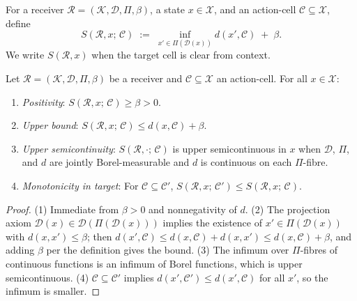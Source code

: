 \begin{definition}
\label{def:s-functional-canonical}
For a receiver $\mathcal{R} = (\mathcal{K}, \mathcal{D}, \Pi, \beta)$, a
state $x \in \mathcal{X}$, and an action-cell $\mathcal{C} \subseteq \mathcal{X}$,
define
\[
  S(\mathcal{R}, x;\, \mathcal{C})
  \;:=\; \inf_{x' \in \Pi(\mathcal{D}(x))} d(x', \mathcal{C}) \;+\; \beta .
\]
We write $S(\mathcal{R}, x)$ when the target cell is clear from context.
\end{definition}

\begin{proposition}
\label{prop:s-basic}
Let $\mathcal{R} = (\mathcal{K}, \mathcal{D}, \Pi, \beta)$ be a receiver and
$\mathcal{C} \subseteq \mathcal{X}$ an action-cell.  For all $x \in \mathcal{X}$:
\begin{enumerate}[(1)]
  \item \emph{Positivity}: $S(\mathcal{R}, x;\, \mathcal{C}) \geq \beta > 0$.
  \item \emph{Upper bound}: $S(\mathcal{R}, x;\, \mathcal{C}) \leq
    d(x, \mathcal{C}) + \beta$.
  \item \emph{Upper semicontinuity}: $S(\mathcal{R}, \cdot;\, \mathcal{C})$
    is upper semicontinuous in $x$ when $\mathcal{D}$, $\Pi$, and $d$ are
    jointly Borel-measurable and $d$ is continuous on each $\Pi$-fibre.
  \item \emph{Monotonicity in target}: For $\mathcal{C} \subseteq \mathcal{C}'$,
    $S(\mathcal{R}, x;\, \mathcal{C}') \leq S(\mathcal{R}, x;\, \mathcal{C})$.
\end{enumerate}
\end{proposition}

\begin{proof}
(1) Immediate from $\beta > 0$ and nonnegativity of $d$.  (2) The projection
axiom $\mathcal{D}(x) \in \mathcal{D}(\Pi(\mathcal{D}(x)))$ implies the
existence of $x' \in \Pi(\mathcal{D}(x))$ with $d(x, x') \leq \beta$; then
$d(x', \mathcal{C}) \leq d(x, \mathcal{C}) + d(x, x') \leq d(x, \mathcal{C})
+ \beta$, and adding $\beta$ per the definition gives the bound.  (3) The
infimum over $\Pi$-fibres of continuous functions is an infimum of Borel
functions, which is upper semicontinuous.  (4) $\mathcal{C} \subseteq \mathcal{C}'$
implies $d(x', \mathcal{C}') \leq d(x', \mathcal{C})$ for all $x'$, so the
infimum is smaller.
\end{proof}

